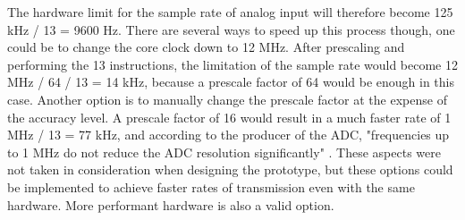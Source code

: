 The hardware limit for the sample rate of analog input will therefore become 125 kHz / 13 = 9600 Hz.
There are several ways to speed up this process though, one could be to change the core clock down to 12 MHz. 
After prescaling and performing the 13 instructions, the limitation of the sample rate would become 12 MHz / 64 / 13 = 14 kHz, because a prescale factor of 64 would be enough in this case.
Another option is to manually change the prescale factor at the expense of the accuracy level.
A prescale factor of 16 would result in a much faster rate of 1 MHz / 13 = 77 kHz, and according to the producer of the ADC, "frequencies up to 1 MHz do not reduce the ADC resolution significantly" \cite{atmel}. 
These aspects were not taken in consideration when designing the prototype, but these options could be implemented to achieve faster rates of transmission even with the same hardware.
More performant hardware is also a valid option.


